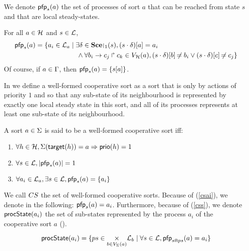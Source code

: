 We denote $\mathsf{pfp}_s(a)$ the set of processes of sort $a$ that can be reached from state $s$ and that are local steady-states.
\begin{definition}
\label{def:pfp}
  For all $a \in \mathcal{H}$ and $s \in \mathcal{L}$,
  \begin{align*}
    \pfp_s(a) = \{ a_i \in \PHl_a &\mid \exists \delta \in \restriction{\Sce}{1}(s), \PHget{(s \PHplay \delta)}{a} = a_i \\
    & \quad \wedge \forall \PHhit{b_i}{c_j}{c_k} \in \Vh(a), \PHget{(s \PHplay \delta)}{b} \neq b_i \vee \PHget{(s \PHplay \delta)}{c} \neq c_j \}
  \end{align*}
  Of course, if $a \in \Gamma$, then $\mathsf{pfp}_s(a) = \{ {s[a]} \}$.
\end{definition}

In  we define a well-formed cooperative sort as a sort that is only by actions of priority $1$ and so that
any sub-state of its neighbourhood is represented by exactly one local steady state in this sort,
and all of its processes represents at least one sub-state of its neighbourhood. 
\begin{definition}
\label{def:cs}
  A sort $a \in \Sigma$ is said to be a well-formed cooperative sort iff:
  \begin{enumerate}
    \item $\forall h \in \mathcal{H}, \Sigma(\mathsf{target}(h)) = a \Rightarrow \mathsf{prio}(h) = 1$
    \item \label{csai} $\forall s \in \mathcal{L}, |\mathsf{pfp}_s(a)| = 1$
    \item \label{css} $\forall a_i \in \mathcal{L}_a, \exists s \in \mathcal{L}, \mathsf{pfp}_s(a) = \{ a_i \}$
  \end{enumerate}
\end{definition}
We call $CS$ the set of well-formed cooperative sorts.
Because of (\ref{csai}), we denote in the following: $\mathsf{pfp}_s(a) = a_i$.
Furthermore, because of (\ref{css}), we denote $\mathsf{procState}(a_i)$ the set of sub-states represented by the process $a_i$ of the cooperative sort $a$ ().
\begin{definition}
\label{def:csState}
  $$\mathsf{procState}(a_i) = \{ ps \in \underset{b \in V_\Sigma(a)}{\times} \mathcal{L}_b \mid \forall s \in \mathcal{L}, \mathsf{pfp}_{s \Cap ps}(a) = a_i \}$$
\end{definition}

